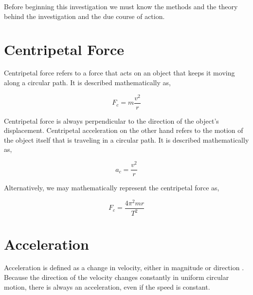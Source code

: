 {Before beginning this investigation we must know the methods and the theory behind the investigation and the due course of action.}

\section{{Centripetal Force}}

	{Centripetal force refers to a force
that acts on an object that keeps it moving along a circular path. It is described mathematically as,}

		$$F_{c} = m\frac{v^2}{r}$$

	{Centripetal force is always perpendicular to the direction of the object's
displacement. Centripetal acceleration on the other hand refers to the motion of the object itself
that is traveling in a circular path. It is described mathematically as,}

		$$a_{c} = \frac{v^2}{r}$$

	{Alternatively, we may mathematically represent the centripetal force as,}

		$$F_{c} = \frac{4\pi^2mr}{T^2}$$
		
\section{{Acceleration}}

	{Acceleration is defined as a change in velocity, either in magnitude or direction . Because the direction of the velocity changes constantly in uniform circular motion, there is always an acceleration, even if the speed is constant.}
	
